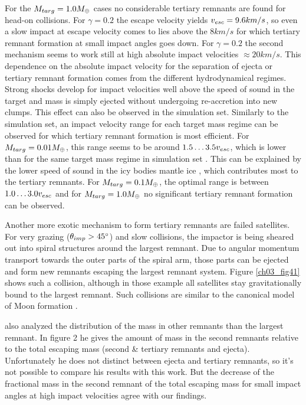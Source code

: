 For the $M_{targ} = 1.0 M_{\oplus}$ cases no considerable tertiary remnants are found for head-on collisions. For $\gamma = 0.2$ the escape velocity yields $v_{esc} = 9.6 km/s$, so even a slow impact at escape velocity comes to lies above the $8 km/s$ for which tertiary remnant formation at small impact angles goes down. For $\gamma = 0.2$ the second mechanism seems to work still at high absolute impact velocities $\approx 20km/s$. This dependence on the absolute impact velocity for the separation of ejecta or tertiary remnant formation comes from the different hydrodynamical regimes. Strong shocks develop for impact velocities well above the speed of sound in the target and mass is simply ejected without undergoing re-accretion into new clumps. This effect can also be observed in the \iss simulation set. Similarly to the \css simulation set, an impact velocity range for each target mass regime can be observed for which tertiary remnant formation is most efficient. For $M_{targ} = 0.01 M_{\oplus}$, this range seems to be around $1.5 \dots 3.5 v_{esc}$, which is lower than for the same target mass regime in simulation set \css. This can be explained by the lower speed of sound in the icy bodies mantle ice \citep{Stewart:2003p2802}, which contributes most to the tertiary remnants. For $M_{targ} = 0.1 M_{\oplus}$, the optimal range is between $1.0 \dots 3.0 v_{esc}$ and for $M_{targ} = 1.0 M_{\oplus}$ no significant tertiary remnant formation can be observed.

Another more exotic mechanism to form tertiary remnants are failed satellites. For very grazing ($\theta_{imp} > 45 ^\circ$) and slow collisions, the impactor is being sheared out into spiral structures around the largest remnant. Due to angular momentum transport towards the outer parts of the spiral arm, those parts can be ejected and form new remnants escaping the largest remnant system. Figure \ref{ch03_fig41} shows such a collision, although in those example all satellites stay gravitationally bound to the largest remnant. Such collisions are similar to the canonical model of Moon formation \citep{Benz:1985p1755}.

\cite{Agnor:2004p3329} also analyzed the distribution of the mass in other remnants than the largest remnant. In figure 2 he gives the amount of mass in the second remnants relative to the total escaping mass (second \& tertiary remnants and ejecta). Unfortunately he does not distinct between ejecta and tertiary remnants, so it's not possible to compare his results with this work. But the decrease of the fractional mass in the second remnant of the total escaping mass for small impact angles at high impact velocities agree with our findings.

